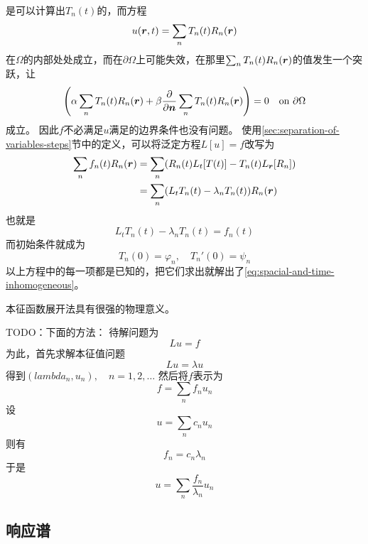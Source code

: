 \documentclass[UTF8]{ctexart}
\begin{document}
是可以计算出$T_n(t)$的，而方程
\[
    u(\vb*{r}, t) = \sum_n T_n(t) R_n(\vb*{r})
\]
在$\Omega$的内部处处成立，而在$\partial \Omega$上可能失效，在那里$\sum_n T_n(t) R_n(\vb*{r})$的值发生一个突跃，让
\[
    \left(\alpha \sum_n T_n(t) R_n(\vb*{r}) + \beta \pdv{\vb*{n}} \sum_n T_n(t) R_n(\vb*{r}) \right) = 0 \quad \text{on $\partial \Omega$}
\]
成立。
因此$f$不必满足$u$满足的边界条件也没有问题。
使用\ref{sec:separation-of-variables-steps}节中的定义，可以将泛定方程$L[u]=f$改写为
\[
    \begin{aligned}
        \sum_n f_n(t) R_n(\vb*{r}) &= \sum_n (R_n(t) L_t[T(t)] - T_n(t) L_{\vb*{r}}[R_n]) \\
        &= \sum_n (L_t T_n(t) - \lambda_n T_n(t)) R_n(\vb*{r})
    \end{aligned}
\]
也就是
\[
    L_t T_n(t) - \lambda_n T_n(t) = f_n(t)
\]
而初始条件就成为
\[
    T_n(0) = \varphi_n, \quad T_n'(0) = \psi_n
\]
以上方程中的每一项都是已知的，把它们求出就解出了\eqref{eq:spacial-and-time-inhomogeneous}。

本征函数展开法具有很强的物理意义。


TODO：下面的方法：
待解问题为
\[
    L u = f
\]
为此，首先求解本征值问题
\[
    L u = \lambda u
\]
得到$(lambda_n , u_n) , \quad n = 1, 2, \ldots$
然后将$f$表示为
\[
    f = \sum_n f_n u_n
\]
设
\[
    u = \sum_n c_n u_n
\]
则有
\[
    f_n = c_n \lambda_n
\]
于是
\[
    u = \sum_n \frac{f_n}{\lambda_n} u_n
\]
\subsection{响应谱}
\end{document}
